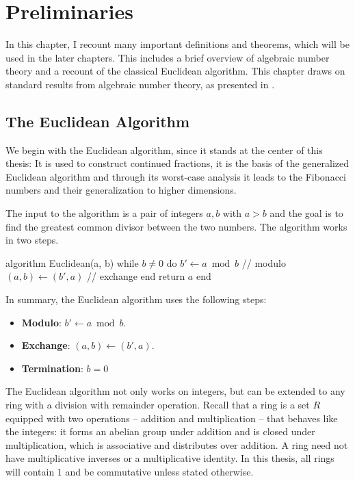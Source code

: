 \chapter{Preliminaries}
\label{ch:preliminaries}

In this chapter, I recount many important definitions and theorems, which will
be used in the later chapters.
This includes a brief overview of algebraic number theory and a recount of the
classical Euclidean algorithm.
This chapter draws on standard results from algebraic number theory, as
presented in \cite{Dummit04}.

\section{The Euclidean Algorithm}

We begin with the Euclidean algorithm,
since it stands at the center of this thesis:
It is used to construct continued fractions,
it is the basis of the generalized Euclidean algorithm
and through its worst-case analysis it leads to the Fibonacci numbers and their
generalization to higher dimensions.

The input to the algorithm is a pair of integers $a, b$ with $a > b$ and the
goal is to find the greatest common divisor between the two numbers. The
algorithm works in two steps.

\begin{Pseudocode}
algorithm Euclidean(a, b)
  while $b ≠ 0$ do
    $b' ← a \bmod b$ // modulo
    $(a, b) ← (b', a)$ // exchange
  end
  return $a$
end
\end{Pseudocode}

In summary, the Euclidean algorithm uses the following steps:
\begin{itemize}
  \item \textbf{Modulo}: $b' ← a \bmod b$.
  \item \textbf{Exchange}: $(a, b) ← (b', a)$.
  \item \textbf{Termination}: $b = 0$
\end{itemize}

The Euclidean algorithm not only works on integers,
but can be extended to any ring with a division with remainder operation.
Recall that a ring is a set $R$ equipped with two operations -- addition and
multiplication -- that behaves like the integers:
it forms an abelian group under addition and is closed under multiplication,
which is associative and distributes over addition.
A ring need not have multiplicative inverses or a multiplicative identity.
In this thesis, all rings will contain $1$ and be commutative unless stated
otherwise.

